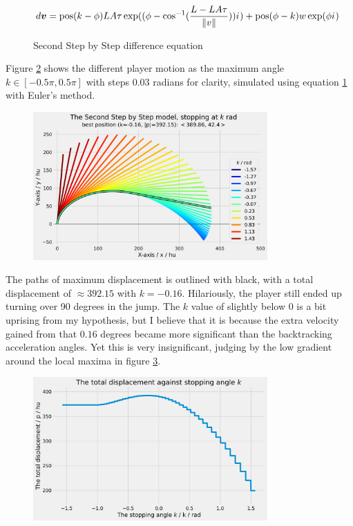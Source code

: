 \begin{figure}[H]
    \centering
    \[
        d\boldsymbol{v} = \text{pos}(k - \phi) LA\tau \exp((\phi - \cos^{-1}(\frac{L-LA\tau}{\|v\|})) {i\mkern1mu}) + \text{pos}(\phi - k) w \exp(\phi {i\mkern1mu})
    \]
    \caption{Second Step by Step difference equation}
    \label{fig:ssbs}
\end{figure}

Figure \ref{fig:sbs2} shows the different player motion as the maximum angle $k\in [-0.5\pi, 0.5\pi]$ with steps $0.03$ radians for clarity, simulated using equation \ref{fig:ssbs} with Euler's method.

\begin{figure}[H]
    \centering
    \includegraphics[width=0.8\textwidth]{assets/step_by_step_2.png}
    \caption{}
    \label{fig:sbs2}
\end{figure}

The paths of maximum displacement is outlined with black, with a total displacement of $\approx 392.15$ with $k=-0.16$. Hilariously, the player still ended up turning over 90 degrees in the jump. The $k$ value of slightly below $0$ is a bit uprising from my hypothesis, but I believe that it is because the extra velocity gained from that $0.16$ degrees became more significant than the backtracking acceleration angles. Yet this is very insignificant, judging by the low gradient around the local maxima in figure \ref{fig:sbs2k}.

\begin{figure}[H]
    \centering
    \includegraphics[width=0.8\textwidth]{assets/step_by_step_2k.png}
    \caption{}
    \label{fig:sbs2k}
\end{figure}

